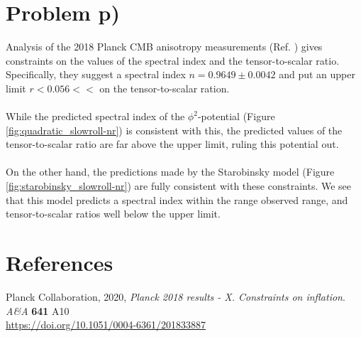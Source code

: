 \documentclass[reprint,english,notitlepage]{revtex4-1}  %
\numberwithin{equation}{section}
\begin{document}
\section{Problem p)}
Analysis of the 2018 Planck CMB anisotropy measurements (Ref. \cite{Planck})
gives constraints on the values of the spectral index and the
tensor-to-scalar ratio. Specifically, they suggest a spectral index
$n = 0.9649 \pm 0.0042$ and put an upper limit $r<0.056<<$ on the tensor-to-scalar
ration.
\\ \\
While the predicted spectral index of the $\phi^2$-potential (Figure
\ref{fig:quadratic_slowroll-nr}) is consistent with this, the
predicted values of the tensor-to-scalar ratio are far above the upper limit,
ruling this potential out.
\\ \\
On the other hand, the predictions made by the Starobinsky model (Figure
\ref{fig:starobinsky_slowroll-nr}) are fully consistent with these
constraints. We see that this model predicts a spectral index within the
range observed range, and tensor-to-scalar ratios well below
the upper limit.

\section*{References}

\begin{itemize}
	Planck Collaboration, 2020,
	\textit{Planck 2018 results - X. Constraints on inflation}.
	\textit{A\&A} \textbf{641} A10 \\
	\url{https://doi.org/10.1051/0004-6361/201833887}
\end{itemize}
\end{document}
